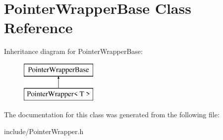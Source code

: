 \hypertarget{classPointerWrapperBase}{\section{Pointer\-Wrapper\-Base Class Reference}
\label{classPointerWrapperBase}
}
Inheritance diagram for Pointer\-Wrapper\-Base\-:\begin{figure}[H]
\begin{center}
\leavevmode
\includegraphics[height=2.000000cm]{classPointerWrapperBase}
\end{center}
\end{figure}


The documentation for this class was generated from the following file\-:\begin{DoxyCompactItemize}
\item 
include/Pointer\-Wrapper.\-h\end{DoxyCompactItemize}
